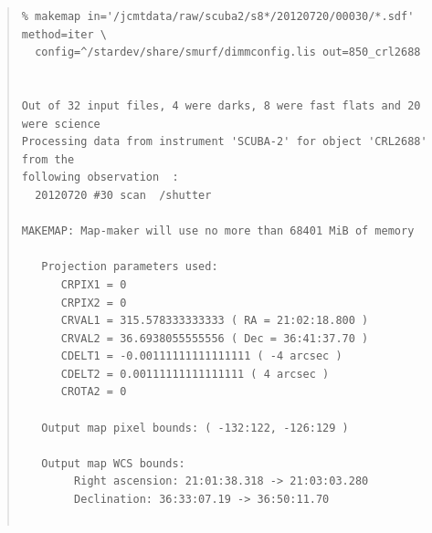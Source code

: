\documentclass[twoside,11pt]{article}
\renewcommand{\_}{\texttt{\symbol{95}}}
\newenvironment{myquote}{\begin{quote}\begin{small}}{\end{small}\end{quote}}
\begin{document}
\begin{myquote}
\begin{verbatim}
% makemap in='/jcmtdata/raw/scuba2/s8*/20120720/00030/*.sdf' method=iter \
  config=^/stardev/share/smurf/dimmconfig.lis out=850_crl2688 


Out of 32 input files, 4 were darks, 8 were fast flats and 20 were science
Processing data from instrument 'SCUBA-2' for object 'CRL2688' from the   
following observation  :                                                  
  20120720 #30 scan  /shutter                                             

MAKEMAP: Map-maker will use no more than 68401 MiB of memory

   Projection parameters used:
      CRPIX1 = 0              
      CRPIX2 = 0              
      CRVAL1 = 315.578333333333 ( RA = 21:02:18.800 )
      CRVAL2 = 36.6938055555556 ( Dec = 36:41:37.70 )
      CDELT1 = -0.00111111111111111 ( -4 arcsec )    
      CDELT2 = 0.00111111111111111 ( 4 arcsec )      
      CROTA2 = 0                                     

   Output map pixel bounds: ( -132:122, -126:129 )

   Output map WCS bounds:
        Right ascension: 21:01:38.318 -> 21:03:03.280
        Declination: 36:33:07.19 -> 36:50:11.70      


\end{verbatim}
\end{myquote}
\end{document}
